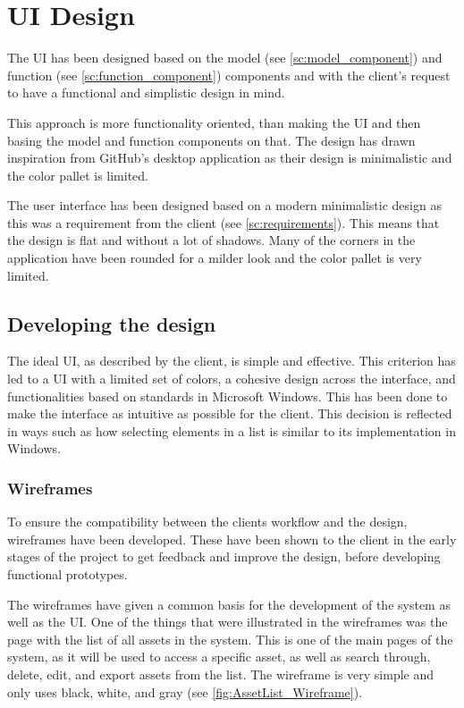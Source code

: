 \chapter{UI Design} \label{ch:ui_design}
The UI has been designed based on the model (see \autoref{sc:model_component}) and function (see \autoref{sc:function_component}) components and with the client's request to have a functional and simplistic design in mind.
\par
This approach is more functionality oriented, than making the UI and then basing the model and function components on that. The design has drawn inspiration from GitHub's desktop application \citep{GithubDesktop} as their design is minimalistic \citep{MinimalistUX} and the color pallet is limited.
\par
The user interface has been designed based on a modern minimalistic design \citep{MinimalistUX} as this was a requirement from the client (see \autoref{sc:requirements}). This means that the design is flat and without a lot of shadows. Many of the corners in the application have been rounded for a milder look and the color pallet is very limited.

\section{Developing the design}
The ideal UI, as described by the client, is simple and effective. This criterion has led to a UI with a limited set of colors, a cohesive design across the interface, and functionalities based on standards in Microsoft Windows. This has been done to make the interface as intuitive as possible for the client. This decision is reflected in ways such as how selecting elements in a list is similar to its implementation in Windows.

\subsection{Wireframes}
To ensure the compatibility between the clients workflow and the design, wireframes have been developed. These have been shown to the client in the early stages of the project to get feedback and improve the design, before developing functional prototypes.
\par
The wireframes have given a common basis for the development of the system as well as the UI. One of the things that were illustrated in the wireframes was the page with the list of all assets in the system. This is one of the main pages of the system, as it will be used to access a specific asset, as well as search through, delete, edit, and export assets from the list. The wireframe is very simple and only uses black, white, and gray (see \autoref{fig:AssetList_Wireframe}).

